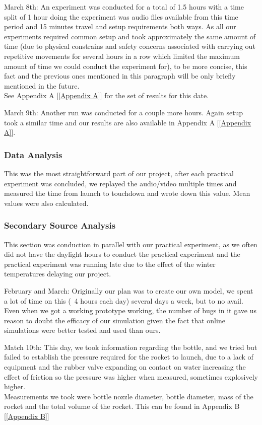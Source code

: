 \documentclass[14pt]{article}
\begin{document}
March 8th: An experiment was conducted for a total of 1.5 hours with a time split of 1 hour doing the experiment was audio files available from this time period and 15 minutes travel and setup requirements both ways. As all our experiments required common setup and took approximately the same amount of time (due to physical constrains and safety concerns associated with carrying out repetitive movements for several hours in a row which limited the maximum amount of time we could conduct the experiment for), to be more concise, this fact and the previous ones mentioned in this paragraph will be only briefly mentioned in the future.\\See Appendix A [\ref{Appendix A}] for the set of results for this date.

March 9th: Another run was conducted for a couple more hours. Again setup took a similar time and our results are also available in Appendix A [\ref{Appendix A}].





\subsubsection{Data Analysis}
This was the most straightforward part of our project, after each practical experiment was concluded, we replayed the audio/video multiple times and measured the time from launch to touchdown and wrote down this value. Mean values were also calculated.



\subsubsection{Secondary Source Analysis}
This section was conduction in parallel with our practical experiment, as we often did not have the daylight hours to conduct the practical experiment and the practical experiment was running late due to the effect of the winter temperatures delaying our project.

February and March: Originally our plan was to create our own model, we spent a lot of time on this (~4 hours each day) several days a week, but to no avail. Even when we got a working prototype working, the number of bugs in it gave us reason to doubt the efficacy of our simulation given the fact that online simulations were better tested and used than ours.

Match 10th: This day, we took information regarding the bottle, and we tried but failed to establish the pressure required for the rocket to launch, due to a lack of equipment and the rubber valve expanding on contact on water increasing the effect of friction so the pressure was higher when measured, sometimes explosively higher. \\
Measurements we took were bottle nozzle diameter, bottle diameter, mass of the rocket and the total volume of the rocket. This can be found in Appendix B [\ref{Appendix B}]
\end{document}
